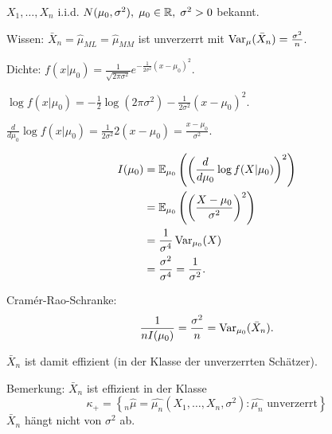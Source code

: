 \documentclass{tstextbook}
\begin{document}
\begin{example}
	$ X_1,\ldots,X_n $ i.i.d. $ N(\mu_0,\sigma^2), \; \mu_0 \in \mathbb R,\; \sigma^2 > 0 $ bekannt.
	
	Wissen: $ \bar{X}_n = \hat{\mu}_{ML} = \hat{\mu}_{MM} $ ist unverzerrt mit $\operatorname{Var}_{\mu} (\bar{X}_n) = \frac{\sigma^2}{n}$.  
	
	Dichte: $ f(x|\mu_0) = \frac{1}{\sqrt{2\pi\sigma^2}} e^{-\frac{1}{2\sigma^2}(x-\mu_0)^2} $. 
	
	$ \log f(x|\mu_0) = -\frac{1}{2}\log(2\pi\sigma^2)-\frac{1}{2\sigma^2}(x-\mu_0)^2 $. 
	
	$ \frac{d}{d\mu_0}\log f(x|\mu_0) = \frac{1}{2\sigma^2}2(x-\mu_0) = \frac{x-\mu_0}{\sigma^2} $.
	
	\[
	\begin{aligned}
		I(\mu_0) & = \mathbb E_{\mu_0} \left(\left(\frac{d}{d\mu_0}\log f(X|\mu_0)\right)^2\right) \\
		& = \mathbb E_{\mu_0}\left(\left(\frac{X-\mu_0}{\sigma^2}\right)^2\right) \\
		& = \frac{1}{\sigma^4}\operatorname{Var}_{\mu_0}(X) \\
		& = \frac{\sigma^2}{\sigma^4} = \frac{1}{\sigma^2}. 
	\end{aligned}
	\]
	
	Cramér-Rao-Schranke:
	\[
	\frac{1}{n I(\mu_0)} = \frac{\sigma^2}{n} = \operatorname{Var}_{\mu_0}(\bar{X}_n) .
	\]
	
	$ \bar{X}_n $ ist damit effizient (in der Klasse der unverzerrten Schätzer).
\end{example}

\begin{remark}
	Bemerkung:
	$ \bar{X}_n $  ist effizient in der Klasse
	\[
	\kappa_+ = \left\lbrace_n \hat{\mu} = \hat{\mu_n}(X_1,\ldots,X_n, \sigma^2) \colon \hat{\mu_n} \text{ unverzerrt}\right\rbrace
	\]
	$ \bar{X}_n $ hängt nicht von $ \sigma^2 $ ab.
\end{remark}
\end{document}
